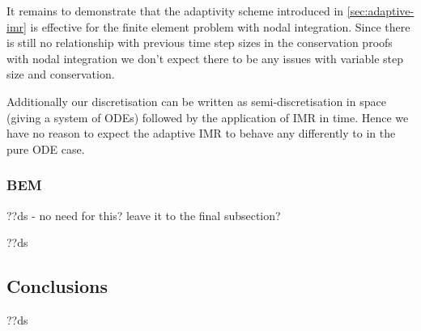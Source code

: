 It remains to demonstrate that the adaptivity scheme introduced in \autoref{sec:adaptive-imr} is effective for the finite element problem with nodal integration.
Since there is still no relationship with previous time step sizes in the conservation proofs with nodal integration we don't expect there to be any issues with variable step size and conservation.

Additionally our discretisation can be written as semi-discretisation in space (giving a system of ODEs) followed by the application of IMR in time.
Hence we have no reason to expect the adaptive IMR to behave any differently to in the pure ODE case.

\subsubsection{BEM}
??ds - no need for this? leave it to the final subsection?


??ds


\subsection{Conclusions}

??ds


